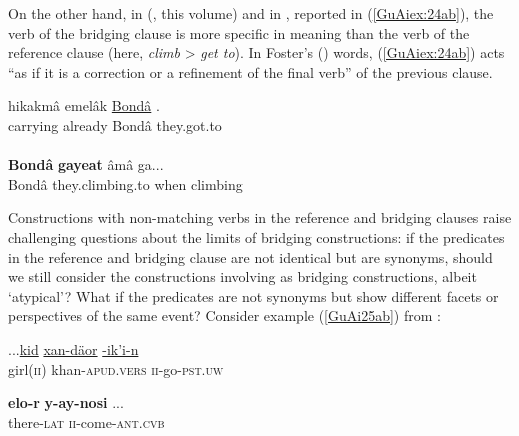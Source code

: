 \documentclass[output=paper]{LSP/langsci}
\begin{document}
On the other hand, in  (\citeauthor{jarkey18}, this volume) and in , reported in (\ref{GuAiex:24ab}), the verb of the bridging clause is more specific in meaning than the verb of the reference clause (here, \textit{climb} > \textit{get to}). In Foster’s (\citeyear{foster81}) words, (\ref{GuAiex:24ab}) acts ``as if it is a correction or a refinement of the final verb'' of the previous clause.


\begin{exe}
\ex \label{GuAiex:24ab}
\begin{xlist}
\ex \label{GuAiex:24a}
\gll hikakmâ   emelâk \underline{Bondâ} \underline{}. \\
carrying   already Bondâ they.got.to\\
\glt {} \\
\ex \label{GuAiex:24b}
\gll  \textbf{Bondâ } \textbf{gayeat}     âmâ   ga...\\
 Bondâ they.climbing.to   when   climbing \\
\glt {}
\end{xlist}
\end{exe}


Constructions with non-matching verbs in the reference and bridging clauses raise challenging questions about the limits of bridging constructions: if the predicates in the reference and bridging clause are not identical but are synonyms, should we still consider the constructions involving  as bridging constructions, albeit `atypical'? What if the predicates are not synonyms but show different facets or perspectives of the same event? Consider example (\ref{GuAi25ab}) from :

\begin{exe}
	\ex	\label{GuAi25ab}
	\begin{xlist}
		\ex	\label{GuAi25a}
		\gll	...\underline{kid}  	\underline{xan-däor}   		\underline{-ik’i-n}\\
			 girl(\textsc{ii}) 	khan-\textsc{apud.vers} 	\textsc{ii}-go-\textsc{pst.uw} \\
		\glt	{}

		\ex	\label{GuAi25b}
		\gll			\textbf{elo-r}    	\textbf{y-ay-nosi}   			... \\
			there-\textsc{lat}	\textsc{ii}-come-\textsc{ant.cvb} 	  \\
		\glt	{}
	\end{xlist}
\end{exe}
\end{document}
